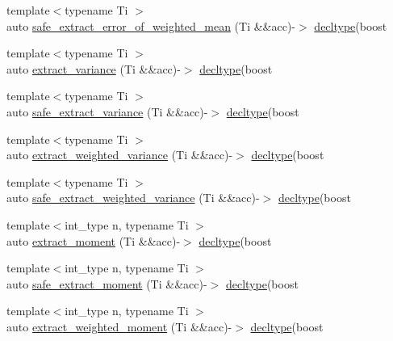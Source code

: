 \begin{DoxyCompactItemize}
\item 
{\footnotesize template$<$typename Ti $>$ }\\auto \hyperlink{namespaceIceBRG_ae73defb4978141002640523118e2b5c9}{safe\-\_\-extract\-\_\-error\-\_\-of\-\_\-weighted\-\_\-mean} (Ti \&\&acc)-\/$>$ \hyperlink{namespaceIceBRG_a528e5024ecab03049320529180ae84a8}{decltype}(boost
\item 
{\footnotesize template$<$typename Ti $>$ }\\auto \hyperlink{namespaceIceBRG_aa14c8d7e5c519143513edd983cefb800}{extract\-\_\-variance} (Ti \&\&acc)-\/$>$ \hyperlink{namespaceIceBRG_a528e5024ecab03049320529180ae84a8}{decltype}(boost
\item 
{\footnotesize template$<$typename Ti $>$ }\\auto \hyperlink{namespaceIceBRG_a33630d39b7873eeebbcdc8c71c56d882}{safe\-\_\-extract\-\_\-variance} (Ti \&\&acc)-\/$>$ \hyperlink{namespaceIceBRG_a528e5024ecab03049320529180ae84a8}{decltype}(boost
\item 
{\footnotesize template$<$typename Ti $>$ }\\auto \hyperlink{namespaceIceBRG_ab016a04bfeffcda457cad17b97b83168}{extract\-\_\-weighted\-\_\-variance} (Ti \&\&acc)-\/$>$ \hyperlink{namespaceIceBRG_a528e5024ecab03049320529180ae84a8}{decltype}(boost
\item 
{\footnotesize template$<$typename Ti $>$ }\\auto \hyperlink{namespaceIceBRG_a52a516b01aa6fd45a9a694ea8b6bc672}{safe\-\_\-extract\-\_\-weighted\-\_\-variance} (Ti \&\&acc)-\/$>$ \hyperlink{namespaceIceBRG_a528e5024ecab03049320529180ae84a8}{decltype}(boost
\item 
{\footnotesize template$<$int\-\_\-type n, typename Ti $>$ }\\auto \hyperlink{namespaceIceBRG_a98c3725589857566072e405bf7693d53}{extract\-\_\-moment} (Ti \&\&acc)-\/$>$ \hyperlink{namespaceIceBRG_a528e5024ecab03049320529180ae84a8}{decltype}(boost
\item 
{\footnotesize template$<$int\-\_\-type n, typename Ti $>$ }\\auto \hyperlink{namespaceIceBRG_a349d36a93187b2221edc4cca752b5dfd}{safe\-\_\-extract\-\_\-moment} (Ti \&\&acc)-\/$>$ \hyperlink{namespaceIceBRG_a528e5024ecab03049320529180ae84a8}{decltype}(boost
\item 
{\footnotesize template$<$int\-\_\-type n, typename Ti $>$ }\\auto \hyperlink{namespaceIceBRG_a629f1f35e1e9e7a5f96b0b7feb958cf5}{extract\-\_\-weighted\-\_\-moment} (Ti \&\&acc)-\/$>$ \hyperlink{namespaceIceBRG_a528e5024ecab03049320529180ae84a8}{decltype}(boost

\end{DoxyCompactItemize}
